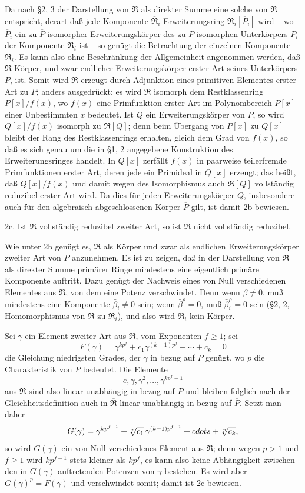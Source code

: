 \documentclass[11pt]{article}
\providecommand{\mR}{\mathfrak{R}}
\providecommand{\bR}{\overline{\mathfrak{R}}}
\providecommand{\bP}{\overline{P}}
\begin{document}
Da nach §2, 3 der Darstellung von $\mR$ als direkter Summe eine solche von $\bR$ entspricht, derart daß jede Komponente $\bR_i$ Erweiterungsring $\mR_i[\bP_i]$ wird -- wo $\bP_i$ ein zu $\bP$ isomorpher Erweiterungskörper des zu $P$ isomorphen Unterkörpers $P_i$ der Komponente $\mR_i$ ist -- so genügt die Betrachtung der einzelnen Komponente $\mR_i$. Es kann also ohne Beschränkung der Allgemeinheit angenommen werden, daß $\mR$ Körper, und zwar endlicher Erweiterungskörper erster Art seines Unterkörpers $P$, ist. Somit wird $\mR$ erzeugt durch Adjunktion eines primitiven Elementes erster Art zu $P$; anders ausgedrückt: es wird $\mR$ isomorph dem Restklassenring $P[x]/f(x)$, wo $f(x)$ eine Primfunktion erster Art im Polynombereich $P[x]$ einer Unbestimmten $x$ bedeutet. Ist $Q$ ein Erweiterungskörper von $P$, so wird $Q[x]/f(x)$ isomorph zu $\mR[Q]$; denn beim Übergang von $P[x]$ zu $Q[x]$ bleibt der Rang des Restklassenrings erhalten, gleich dem Grad von $f(x)$, so daß es sich genau um die in §1, 2 angegebene Konstruktion des Erweiterungsringes handelt. In $Q[x]$ zerfällt $f(x)$ in paarweise teilerfremde Primfunktionen erster Art, deren jede ein Primideal in $Q[x]$ erzeugt; das heißt, daß $Q[x]/f(x)$ und damit wegen des Isomorphismus auch $\mR[Q]$ vollständig reduzibel erster Art wird. Da dies für jeden Erweiterungskörper $Q$, insbesondere auch für den algebraisch-abgeschlossenen Körper $\bP$ gilt, ist damit 2b bewiesen.

2c. Ist $\mR$ vollständig reduzibel zweiter Art, so ist $\bR$ nicht vollständig reduzibel.

Wie unter 2b genügt es, $\mR$ als Körper und zwar als endlichen Erweiterungskörper zweiter Art von $P$ anzunehmen. Es ist zu zeigen, daß in der Darstellung von $\bR$ als direkter Summe primärer Ringe mindestens eine eigentlich primäre Komponente auftritt. Dazu genügt der Nachweis eines von Null verschiedenen Elementes aus $\bR$, von dem eine Potenz verschwindet. Denn wenn $\bar\beta\ne0$, muß mindestens eine Komponente $\bar\beta_i\ne0$ sein; wenn $\bar\beta^\rho=0$, muß $\bar\beta_i^\rho=0$ sein (§2, 2, Homomorphismus von $\bR$ zu $\bR_i$), und also wird $\bR_i$ kein Körper.

Sei $\gamma$ ein Element zweiter Art aus $\mR$, vom Exponenten $f\ge 1$; sei
\[
        F(\gamma)=\gamma^{kp^f}+c_1\gamma^{(k-1)p^f}+\cdots+c_k=0
\]
die Gleichung niedrigsten Grades, der $\gamma$ in bezug auf $P$ genügt, wo $p$ die Charakteristik von $P$ bedeutet. Die Elemente
\[
        e,\gamma,\gamma^2,\ldots,\gamma^{kp^f-1}
\]
aus $\mR$ sind also linear unabhängig in bezug auf $P$ und bleiben folglich nach der Gleichheitsdefinition auch in $\bR$ linear unabhängig in bezug auf $\bP$. Setzt man daher
\[
        G(\gamma)=\gamma^{kp^{f-1}}+\sqrt[p]{c_1}\,\gamma^{(k-1)p^{f-1}}+\\cdots+\sqrt[p]{c_k},
\]
so wird $G(\gamma)$ ein von Null verschiedenes Element aus $\bR$; denn wegen $p>1$ und $f\ge1$ wird $kp^{f-1}$ stets kleiner als $kp^f$, es kann also keine Abhängigkeit zwischen den in $G(\gamma)$ auftretenden Potenzen von $\gamma$ bestehen. Es wird aber $G(\gamma)^p=F(\gamma)$ und verschwindet somit; damit ist 2c bewiesen.
\end{document}
